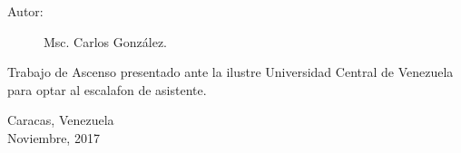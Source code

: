 \begin{titlepage}
\begin{large}
\vspace{1cm}

\begin{description}
\item[Autor:] Msc. Carlos Gonz\'alez.
\end{description}

\begin{flushright}
\begin{minipage}[b][5cm][b]{0,45\textwidth}
Trabajo de Ascenso presentado
ante la ilustre Universidad Central de 
Venezuela para optar al escalafon de asistente.
\end{minipage}
\end{flushright}

\begin{center}

Caracas, Venezuela \\ Noviembre, 2017

\end{center}

\end{large}

\end{titlepage}

%
%
%
%
%
%
%
%
%
%
%
%
%
%
%

